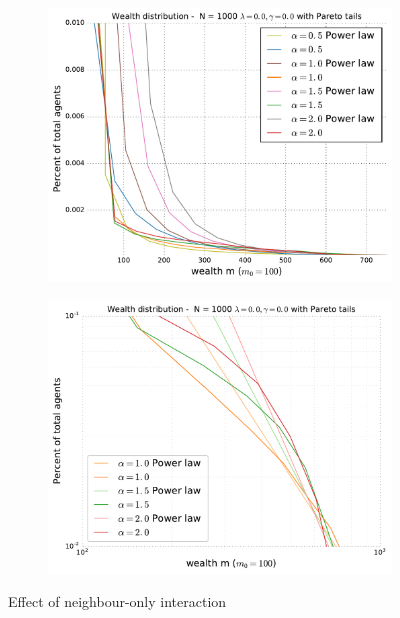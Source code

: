\documentclass[10pt, a4paper]{amsart}
\begin{document}
\begin{figure}
\begin{subfigure}{.49\textwidth}
	\centering
	\includegraphics[width=\linewidth]{../figures/5d/5d_0-var-0-PARETO.pdf}
	\caption{}
	\label{fig:neighbourpareto1}
\end{subfigure}
\begin{subfigure}{.49\textwidth}
	\centering
	\includegraphics[width=\linewidth]{../figures/5d/5d_0-var-0-POWERLOG.pdf}
	\caption{}
	\label{fig:neighourpareto2}
\end{subfigure}
\caption{Effect of neighbour-only interaction}
\end{figure}
\end{document}
